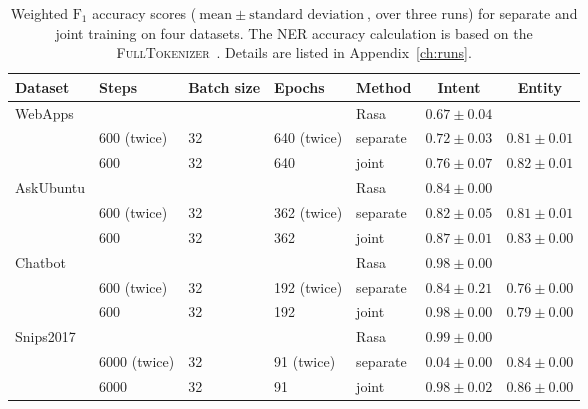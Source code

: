 \begin{table}[htbp]
    \centering
    \begin{tabular}{l l l l l c c}
        \textbf{Dataset}    & \textbf{Steps}  & \textbf{Batch size} & \textbf{Epochs}  & \textbf{Method}   & \textbf{Intent}  & \textbf{Entity}\\
        \hline
        WebApps             & & & & Rasa & $0.67 \pm 0.04$\\
                            & 600 (twice) & 32 & 640 (twice) & separate & $0.72 \pm 0.03$ & $0.81 \pm 0.01$ \\
                            & 600 & 32 & 640 & joint & $0.76 \pm 0.07$ & $0.82 \pm 0.01$ \\
        \hline
        AskUbuntu           & & & & Rasa & $0.84 \pm 0.00$ \\
                            & 600 (twice) & 32 & 362 (twice) & separate & $0.82 \pm 0.05$ & $0.81 \pm 0.01$\\
                            & 600 & 32 & 362 & joint & $0.87 \pm 0.01$ & $0.83 \pm 0.00$\\
        \hline
        Chatbot             & & & & Rasa & $0.98 \pm 0.00$ \\
                            & 600 (twice) & 32 & 192 (twice) & separate & $0.84 \pm 0.21$ & $0.76 \pm 0.00$\\
                            & 600 & 32 & 192 & joint & $0.98 \pm 0.00$ & $0.79 \pm 0.00$\\
        \hline
        Snips2017           & & & & Rasa & $0.99 \pm 0.00$\\
                            & 6000 (twice) & 32 & 91 (twice) & separate & $0.04 \pm 0.00$ & $0.84 \pm 0.00$\\
                            & 6000 & 32 & 91 & joint & $0.98 \pm 0.02$ & $0.86 \pm 0.00$\\
        \hline
    \end{tabular}
    \caption{Weighted $\text{F}_1$ accuracy scores ($\text{mean} \: \pm \: \text{standard deviation}$, over three runs) for separate and joint training on four datasets.
    The NER accuracy calculation is based on the \textsc{FullTokenizer}~\citep{devlin2019tokenizer}.
    Details are listed in Appendix~\ref{ch:runs}.}
    \label{tab:runs_scores}
\end{table}

